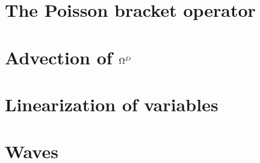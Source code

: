 \documentclass[12pt,a4paper,oneside,openright]{report} %
\begin{document}
\chapter{The Poisson bracket operator}
\label{app:poisson}


\chapter{Advection of \texorpdfstring{$\Omega^D$}{OmegaD}}
\label{app:vortDAdv}


\chapter{Linearization of variables}
\label{app:linearized}


\chapter{Waves}
\label{app:waves}




\end{document}
